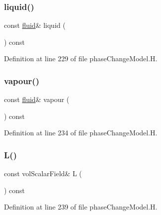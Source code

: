 \subsubsection{\texorpdfstring{liquid()}{liquid()}}
{\footnotesize\ttfamily const \hyperlink{classFoam_1_1fluid}{fluid}\& liquid (\begin{DoxyParamCaption}{ }\end{DoxyParamCaption}) const\hspace{0.3cm}{\ttfamily [inline]}}



Definition at line 229 of file phase\+Change\+Model.\+H.

\mbox{\label{classFoam_1_1phaseChangeModel_a6f06ed151635e5eddf72f9c23b6854bb}} 
\subsubsection{\texorpdfstring{vapour()}{vapour()}}
{\footnotesize\ttfamily const \hyperlink{classFoam_1_1fluid}{fluid}\& vapour (\begin{DoxyParamCaption}{ }\end{DoxyParamCaption}) const\hspace{0.3cm}{\ttfamily [inline]}}



Definition at line 234 of file phase\+Change\+Model.\+H.

\mbox{\label{classFoam_1_1phaseChangeModel_abe53da7ab6885a0c606832841d7bb49f}} 
\subsubsection{\texorpdfstring{L()}{L()}}
{\footnotesize\ttfamily const vol\+Scalar\+Field\& L (\begin{DoxyParamCaption}{ }\end{DoxyParamCaption}) const\hspace{0.3cm}{\ttfamily [inline]}}



Definition at line 239 of file phase\+Change\+Model.\+H.

